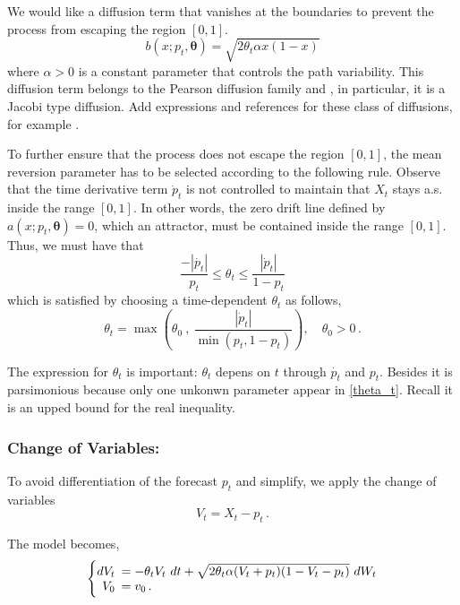 \documentclass[11pt]{article}
\theoremstyle{definition}
\begin{document}
We would like  a diffusion term that vanishes at the boundaries to prevent the process from escaping the region $[0,1]$.
  \begin{equation}
    b (x; p_t,\bm{\theta} )= \sqrt{2 \theta_t \alpha x (1-x)}
  \end{equation}
  where $\alpha >0$ is a constant parameter that controls the path variability. This diffusion term belongs to the Pearson diffusion family and , in particular, it is a Jacobi type diffusion. {\color{red} Add expressions and references for these class of diffusions, for example \cite{iacus1}.}

To further ensure that the process does not escape the region $[0,1]$, the mean reversion parameter has to be selected according to the following rule. Observe that the time derivative term $\dot{p}_t $ is not controlled to maintain that $X_t$ stays a.s.  inside the range $[0,1]$. In other words, the zero drift line defined by $a(x; p_t,\bm{\theta}) =0$, which an attractor, must be contained inside the range $[0,1]$. Thus, we must have that
\begin{equation}
\frac{- |\dot{p_t}|}{p_t} \leq \theta_t \leq \frac{|\dot{p}_t|}{1- p_t}
\end{equation}
which is satisfied  by choosing a time-dependent  $\theta_t$ as follows,
\begin{equation}
\theta_t = \max \left( \theta_0 \ , \ \frac{|\dot{p}_t|}{\min (p_t, 1-p_t)}  \right ),  \quad \theta_0 >0\,. \label{theta_t}
\end{equation}

{\color{red} The expression for $\theta_t$ is important: $\theta_t$ depens on $t$ through $\dot{p_t}$ and $p_t$. Besides it is parsimonious because only one unkonwn parameter appear in \ref{theta_t}. Recall it is an upped bound for the real inequality. } 

\subsubsection*{Change of Variables:}
To avoid differentiation of the forecast $p_t$ and simplify, we apply the change of variables $$V_t = X_t - p_t \,.$$ 

The  model becomes,
\begin{equation}
  \left\{
  \begin{array}{@{}rl@{}}
    dV_t \!\!\!&=  - \theta_t V_t \  dt + \sqrt{2 \theta_t \alpha (V_t +p_t ) (1-V_t-p_t)} \  dW_t   \\ %
V_0 \!\!\!&=  v_0 \,. \label{VtSDE}
\end{array}\right. 
\end{equation}
\end{document}
